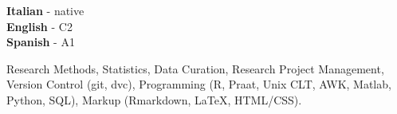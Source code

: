 \documentclass[9pt]{developercv} %
\begin{document}
\begin{minipage}[t]{0.3\textwidth}
	\vspace{-\baselineskip} %


	\textbf{Italian} - native\\
	\textbf{English} - C2 \\
	\textbf{Spanish} - A1
\end{minipage}
\begin{minipage}[t]{0.6\textwidth}
	\vspace{-\baselineskip} %


	Research Methods, Statistics, Data Curation, Research Project Management, Version Control (git, dvc), Programming (R, Praat, Unix CLT, AWK, Matlab, Python, SQL), Markup (Rmarkdown, \LaTeX{}, HTML/CSS).
\end{minipage}


\end{document}

